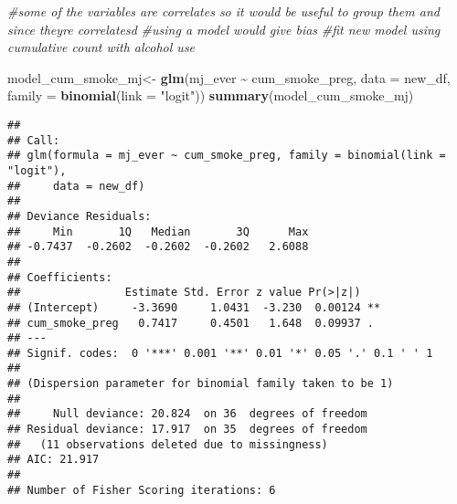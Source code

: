 \documentclass[
]{article}
\newenvironment{Shaded}{\begin{snugshade}}{\end{snugshade}}
\newcommand{\AttributeTok}[1]{\textcolor[rgb]{0.13,0.29,0.53}{#1}}
\newcommand{\CommentTok}[1]{\textcolor[rgb]{0.56,0.35,0.01}{\textit{#1}}}
\newcommand{\FunctionTok}[1]{\textcolor[rgb]{0.13,0.29,0.53}{\textbf{#1}}}
\newcommand{\NormalTok}[1]{#1}
\newcommand{\OtherTok}[1]{\textcolor[rgb]{0.56,0.35,0.01}{#1}}
\newcommand{\SpecialCharTok}[1]{\textcolor[rgb]{0.81,0.36,0.00}{\textbf{#1}}}
\newcommand{\StringTok}[1]{\textcolor[rgb]{0.31,0.60,0.02}{#1}}
\begin{document}
\begin{Shaded}
\begin{Highlighting}[]
\CommentTok{\#some of the variables are correlates so it would be useful to group them and since theyre correlatesd}
\CommentTok{\#using a model would give bias }
\CommentTok{\#fit new model using cumulative count with alcohol use }

\NormalTok{model\_cum\_smoke\_mj}\OtherTok{\textless{}{-}} \FunctionTok{glm}\NormalTok{(mj\_ever }\SpecialCharTok{\textasciitilde{}}\NormalTok{ cum\_smoke\_preg, }\AttributeTok{data =}\NormalTok{ new\_df, }\AttributeTok{family =} \FunctionTok{binomial}\NormalTok{(}\AttributeTok{link =} \StringTok{"logit"}\NormalTok{))}
\FunctionTok{summary}\NormalTok{(model\_cum\_smoke\_mj)}
\end{Highlighting}
\end{Shaded}

\begin{verbatim}
## 
## Call:
## glm(formula = mj_ever ~ cum_smoke_preg, family = binomial(link = "logit"), 
##     data = new_df)
## 
## Deviance Residuals: 
##     Min       1Q   Median       3Q      Max  
## -0.7437  -0.2602  -0.2602  -0.2602   2.6088  
## 
## Coefficients:
##                Estimate Std. Error z value Pr(>|z|)   
## (Intercept)     -3.3690     1.0431  -3.230  0.00124 **
## cum_smoke_preg   0.7417     0.4501   1.648  0.09937 . 
## ---
## Signif. codes:  0 '***' 0.001 '**' 0.01 '*' 0.05 '.' 0.1 ' ' 1
## 
## (Dispersion parameter for binomial family taken to be 1)
## 
##     Null deviance: 20.824  on 36  degrees of freedom
## Residual deviance: 17.917  on 35  degrees of freedom
##   (11 observations deleted due to missingness)
## AIC: 21.917
## 
## Number of Fisher Scoring iterations: 6
\end{verbatim}
\end{document}
